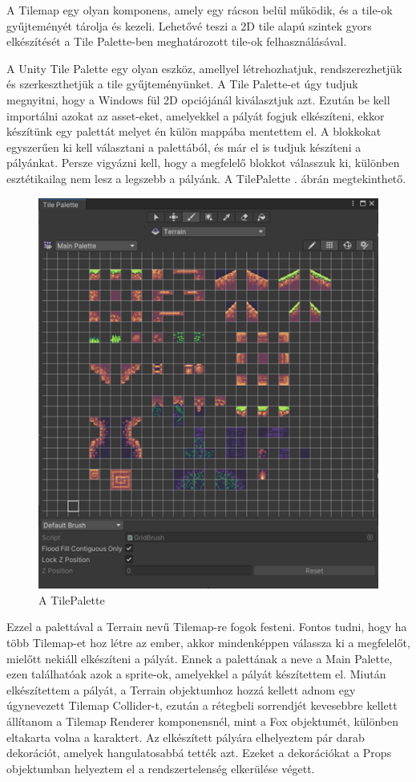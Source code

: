 A Tilemap egy olyan komponens, amely egy rácson belül működik, és a tile-ok gyűjteményét tárolja és kezeli. Lehetővé teszi a 2D tile alapú szintek gyors elkészítését a Tile Palette-ben meghatározott tile-ok felhasználásával.\cite{unitytilemap}

A Unity Tile Palette egy olyan eszköz, amellyel létrehozhatjuk, rendszerezhetjük és szerkeszthetjük a tile gyűjteményünket. A Tile Palette-et úgy tudjuk megnyitni, hogy a Windows fül 2D opciójánál kiválasztjuk azt. Ezután be kell importálni azokat az asset-eket, amelyekkel a pályát fogjuk elkészíteni, ekkor készítünk egy palettát melyet én külön mappába mentettem el. A blokkokat egyszerűen ki kell választani a palettából, és már el is tudjuk készíteni a pályánkat. Persze vigyázni kell, hogy a megfelelő blokkot válasszuk ki, különben esztétikailag nem lesz a legszebb a pályánk.  A TilePalette . ábrán megtekinthető.

\begin{figure}[ht]
\centering
\includegraphics[scale = 0.6]{images/tilepalette.png}
\caption{A TilePalette}
\label{fig:tilepalette}
\end{figure}

Ezzel a palettával a Terrain nevű Tilemap-re fogok festeni. Fontos tudni, hogy ha több Tilemap-et hoz létre az ember, akkor mindenképpen válassza ki a megfelelőt, mielőtt nekiáll elkészíteni a pályát. Ennek a palettának a neve a Main Palette, ezen találhatóak azok a sprite-ok, amelyekkel a pályát készítettem el. Miután elkészítettem a pályát, a Terrain objektumhoz hozzá kellett adnom egy úgynevezett Tilemap Collider-t, ezután a rétegbeli sorrendjét kevesebbre kellett állítanom a Tilemap Renderer komponensnél, mint a Fox objektumét, különben eltakarta volna a karaktert. Az elkészített pályára elhelyeztem pár darab dekorációt, amelyek hangulatosabbá tették azt. Ezeket a dekorációkat a Props objektumban helyeztem el a rendszertelenség elkerülése végett.

